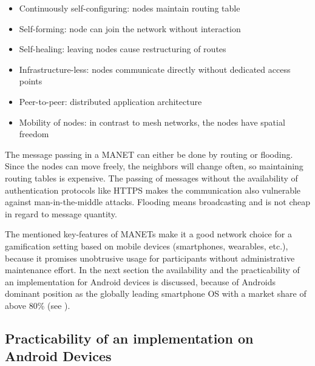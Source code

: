 \begin{itemize}  
	\item Continuously self-configuring: nodes maintain routing table
	\item Self-forming: node can join the network without interaction
	\item Self-healing: leaving nodes cause restructuring of routes
	\item Infrastructure-less: nodes communicate directly without dedicated access points
	\item Peer-to-peer: distributed application architecture
	\item Mobility of nodes: in contrast to mesh networks, the nodes have spatial freedom
\end{itemize}

The message passing in a \gls{MANET} can either be done by routing or flooding. Since the nodes can move freely, the neighbors will change often, so maintaining routing tables is expensive. The passing of messages without the availability of authentication protocols like \gls{HTTPS} makes the communication also vulnerable against man-in-the-middle attacks. Flooding means broadcasting and is not cheap in regard to message quantity.

The mentioned key-features of \glspl{MANET} make it a good network choice for a gamification setting based on mobile devices (smartphones, wearables, etc.), because it promises unobtrusive usage for participants without administrative maintenance effort. In the next section the availability and the practicability of an implementation for Android devices is discussed, because of Androids dominant position as the globally leading smartphone \gls{OS} with a market share of above 80\% (see \textcite{Online:Gartner2016}). 

\subsection{Practicability of an implementation on Android Devices} \label{practicability of an implementation}

